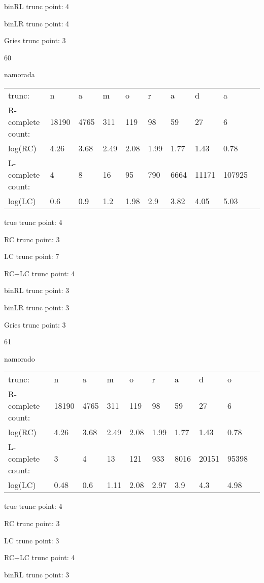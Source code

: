 \documentclass[10pt]{article}
\begin{document}
binRL trunc point: 4

binLR trunc point: 4

Gries trunc point: 3

\vspace{1em}

60

namorada

\begin{tabular}{l|lllllllll}
trunc: & n & a & m & o & r & a & d & a & \\ 
R-complete count: & 18190 & 4765 & 311 & 119 & 98 & 59 & 27 & 6 & \\ 
log(RC) & 4.26 & 3.68 & 2.49 & 2.08 & 1.99 & 1.77 & 1.43 & 0.78 & \\ 
L-complete count: & 4 & 8 & 16 & 95 & 790 & 6664 & 11171 & 107925 & \\ 
log(LC) & 0.6 & 0.9 & 1.2 & 1.98 & 2.9 & 3.82 & 4.05 & 5.03 & \\ 
\end{tabular}

true trunc point: 4

RC trunc point: 3

LC trunc point: 7

RC+LC trunc point: 4

binRL trunc point: 3

binLR trunc point: 3

Gries trunc point: 3

\newpage

61

namorado

\begin{tabular}{l|lllllllll}
trunc: & n & a & m & o & r & a & d & o & \\ 
R-complete count: & 18190 & 4765 & 311 & 119 & 98 & 59 & 27 & 6 & \\ 
log(RC) & 4.26 & 3.68 & 2.49 & 2.08 & 1.99 & 1.77 & 1.43 & 0.78 & \\ 
L-complete count: & 3 & 4 & 13 & 121 & 933 & 8016 & 20151 & 95398 & \\ 
log(LC) & 0.48 & 0.6 & 1.11 & 2.08 & 2.97 & 3.9 & 4.3 & 4.98 & \\ 
\end{tabular}

true trunc point: 4

RC trunc point: 3

LC trunc point: 3

RC+LC trunc point: 4

binRL trunc point: 3
\end{document}

